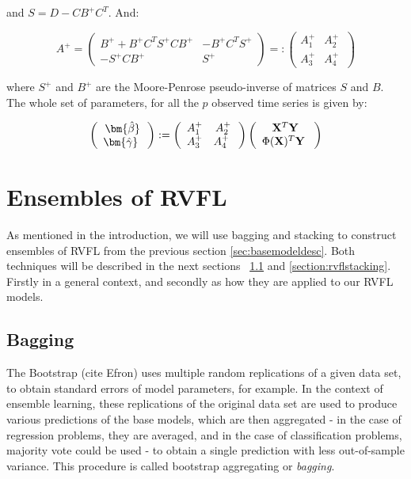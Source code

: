 and $S = D - CB^+C^T$. And:

$$
A^+ = \left( {\begin{array}{cc} B^+ + B^+ C^T
S^+ CB^+  &  -B^+ C^T S^+\\ -S^+CB^+ & S^+ \      \end{array} } \right) =:
\left( {\begin{array}{cc} A_1^+  &  A_2^+\\ A_3^+ & A_4^+ \      \end{array} }
\right)
$$


where $S^+$ and $B^+$ are the Moore-Penrose pseudo-inverse of matrices $S$ and
$B$. The whole set of parameters, for all the $p$ observed time series is given by:

$$
\left( {\begin{array}{c} \bm{\hat{\beta}} \\       \bm{\hat{\gamma}} \      \end{array}
} \right) := \left( {\begin{array}{cc} A_1^+  &  A_2^+\\ A_3^+ & A_4^+ \      \end{array}
} \right)\left( {\begin{array}{c} \bfX^T\bfY \\       \Phi(\bfX)^T\bfY \      \end{array} }
\right)
$$

\section{Ensembles of RVFL}
\label{sec:ensemblemethods}

As mentioned in the introduction, we will use bagging and stacking to construct ensembles of RVFL from the previous section \ref{sec:basemodeldesc}. Both techniques will be described in the next sections ~\ref{section:rvflbagging} and \ref{section:rvflstacking}. Firstly in a general context, and secondly as how they are applied to our RVFL models.


\subsection{Bagging}
\label{section:rvflbagging}

The Bootstrap (cite Efron) uses multiple random replications of a given data set, to obtain standard errors of model parameters, for example. In the context of ensemble learning, these replications of the original data set are used to produce various predictions of the base models, which are then aggregated - in the case of regression problems, they are averaged, and in the case of classification problems, majority vote could be used - to obtain a single prediction with less out-of-sample variance. This procedure is called bootstrap aggregating or \textit{bagging}.

